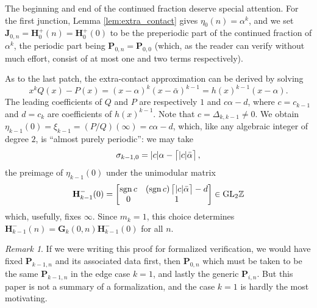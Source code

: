 \documentclass{article}
\numberwithin{equation}{section}
\theoremstyle{definition}
\theoremstyle{remark}
\newtheorem{rem}[thm]{Remark}
\DeclareMathOperator{\sgn}{sgn}
\newcommand{\GL}{\mathrm{GL}}
\newcommand{\ZZ}{\mathbb{Z}}
\newcommand{\ceil}[1]{\left\lceil #1 \right\rceil}
\newcommand{\<}{\left\langle}
\renewcommand{\>}{\right\rangle}
\begin{document}
The beginning and end of the continued fraction deserve special attention. For the first junction, Lemma \ref{lem:extra_contact} gives $\eta_0(n) = \alpha^k$, and we set $\mathbf{J}_{0,n} = \mathbf{H}_0^+(n) = \mathbf{H}_0^+(0)$ to be the preperiodic part of the continued fraction of $\alpha^k$, the periodic part being $\mathbf{P}_{0,n} = \mathbf{P}_{0,0}$ (which, as the reader can verify without much effort, consist of at most one and two terms respectively).

As to the last patch, the extra-contact approximation can be derived by solving
\begin{equation}
  x^k Q(x) - P(x) = (x - \alpha)^k (x - \bar\alpha)^{k-1} = h(x)^{k-1} (x - \alpha).
\end{equation}
The leading coefficients of $Q$ and $P$ are respectively $1$ and $c \alpha - d$, where $c = c_{k-1}$ and $d = c_k$ are coefficients of $h(x)^{k-1}$. Note that $c = \Delta_{k,k-1} \neq 0$. We obtain $\eta_{k-1}(0) = \xi_{k-1} = (P/Q)(\infty) = c \alpha - d$, which, like any algebraic integer of degree $2$, is ``almost purely periodic'': we may take
\begin{equation*}
  \sigma_{k-1,0} = |c| \alpha - \ceil{\strut|c| \bar\alpha},
\end{equation*}
the preimage of $\eta_{k-1}(0)$ under the unimodular matrix
\begin{equation*}
  \mathbf{H}_{k-1}^-(0) = \begin{bmatrix}
    \sgn c & (\sgn c) \ceil{\strut|c| \bar\alpha} - d \\
    0 & 1
  \end{bmatrix} \in \GL_2 \ZZ
\end{equation*}
which, usefully, fixes $\infty$. Since $m_k = 1$, this choice determines $\mathbf{H}_{k-1}^-(n) = \mathbf{G}_k(0,n) \mathbf{H}_{k-1}^-(0)$ for all $n$.

\begin{rem}
  If we were writing this proof for formalized verification, we would have fixed $\mathbf{P}_{k-1,n}$ and its associated data first, then $\mathbf{P}_{0,n}$ which must be taken to be the same $\mathbf{P}_{k-1,n}$ in the edge case $k = 1$, and lastly the generic $\mathbf{P}_{i,n}$. But this paper is not a summary of a formalization, and the case $k = 1$ is hardly the most motivating.
\end{rem}
\end{document}
